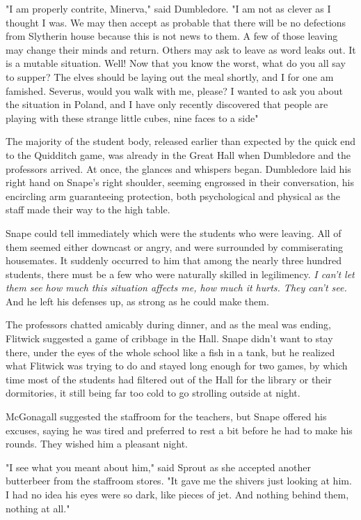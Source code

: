 "I am properly contrite, Minerva," said Dumbledore. "I am not as clever as I thought I was. We may then accept as probable that there will be no defections from Slytherin house because this is not news to them. A few of those leaving may change their minds and return. Others may ask to leave as word leaks out. It is a mutable situation. Well! Now that you know the worst, what do you all say to supper? The elves should be laying out the meal shortly, and I for one am famished. Severus, would you walk with me, please? I wanted to ask you about the situation in Poland, and I have only recently discovered that people are playing with these strange little cubes, nine faces to a side{\el}"

The majority of the student body, released earlier than expected by the quick end to the Quidditch game, was already in the Great Hall when Dumbledore and the professors arrived. At once, the glances and whispers began. Dumbledore laid his right hand on Snape's right shoulder, seeming engrossed in their conversation, his encircling arm guaranteeing protection, both psychological and physical as the staff made their way to the high table.

Snape could tell immediately which were the students who were leaving. All of them seemed either downcast or angry, and were surrounded by commiserating housemates. It suddenly occurred to him that among the nearly three hundred students, there must be a few who were naturally skilled in legilimency. \emph{I can't let them see how much this situation affects me, how much it hurts. They can't see.} And he left his defenses up, as strong as he could make them.

The professors chatted amicably during dinner, and as the meal was ending, Flitwick suggested a game of cribbage in the Hall. Snape didn't want to stay there, under the eyes of the whole school like a fish in a tank, but he realized what Flitwick was trying to do and stayed long enough for two games, by which time most of the students had filtered out of the Hall for the library or their dormitories, it still being far too cold to go strolling outside at night.

McGonagall suggested the staffroom for the teachers, but Snape offered his excuses, saying he was tired and preferred to rest a bit before he had to make his rounds. They wished him a pleasant night.

"I see what you meant about him," said Sprout as she accepted another butterbeer from the staffroom stores. "It gave me the shivers just looking at him. I had no idea his eyes were so dark, like pieces of jet. And nothing behind them, nothing at all."


